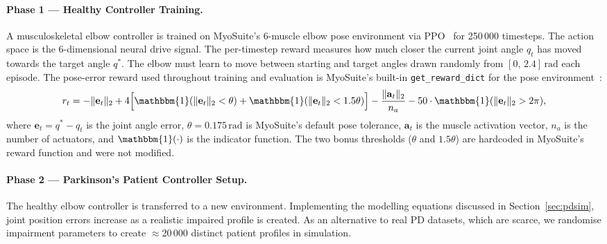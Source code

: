 \documentclass[letterpaper]{article} %
\begin{document}
\paragraph{Phase 1 --- Healthy Controller Training.}
A musculoskeletal elbow controller is trained on MyoSuite's 6-muscle elbow pose
environment via PPO~\citep{sb3} for 250\,000 timesteps.
The action space is the 6-dimensional neural drive signal.
The per-timestep reward measures how much closer the current joint angle $q_t$
has moved towards the target angle $q^*$.
The elbow must learn to move between starting and target angles drawn randomly
from $[0,\,2.4]\,\mathrm{rad}$ each episode.
The pose-error reward used throughout training and evaluation is MyoSuite's
built-in \texttt{get\_reward\_dict} for the pose environment~\citep{caggiano2022}:
\begin{equation}
  r_t = -\lVert \mathbf{e}_t \rVert_2
      + 4\Bigl[\mathbbm{1}(\lVert \mathbf{e}_t \rVert_2 < \theta)
             + \mathbbm{1}(\lVert \mathbf{e}_t \rVert_2 < 1.5\theta)\Bigr]
      - \frac{\lVert \mathbf{a}_t \rVert_2}{n_a}
      - 50\cdot\mathbbm{1}(\lVert \mathbf{e}_t \rVert_2 > 2\pi),
  \label{eq:reward_phase1}
\end{equation}
where $\mathbf{e}_t = q^* - q_t$ is the joint angle error,
$\theta = 0.175\,\mathrm{rad}$ is MyoSuite's default pose tolerance,
$\mathbf{a}_t$ is the muscle activation vector,
$n_a$ is the number of actuators, and
$\mathbbm{1}(\cdot)$ is the indicator function.
The two bonus thresholds ($\theta$ and $1.5\theta$) are hardcoded in MyoSuite's
reward function and were not modified.

\paragraph{Phase 2 --- Parkinson's Patient Controller Setup.}
The healthy elbow controller is transferred to a new environment.
Implementing the modelling equations discussed in
Section~\ref{sec:pdsim}, joint position errors increase as a realistic impaired
profile is created.
As an alternative to real PD datasets, which are scarce, we randomise impairment
parameters to create $\approx$20\,000 distinct patient profiles in simulation.
\end{document}
